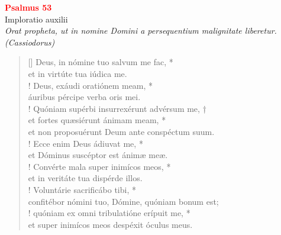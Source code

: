 


\def\greinitialformat#1{%
{\fontsize{39}{39}\selectfont #1}%
}




\vspace{0.3cm}
\begin{center}
 \textcolor{red}{\large \bf Psalmus 53}\\
Imploratio auxilii\\
\textit{\small Orat propheta, ut in nomine Domini a persequentium malignitate liberetur. (Cassiodorus)}
\end{center}
\begin{verse}[\versewidth]
Deus, in nómine tuo salvum me fac, *\\
et in virtúte tua iúdica me.\\!
\vin Deus, exáudi oratiónem meam, *\\
\vin áuribus pércipe verba oris mei.\\!
Quóniam supérbi insurrexérunt advérsum me, †\\
et fortes quæsiérunt ánimam meam, *\\
et non proposuérunt Deum ante conspéctum suum.\\!
\vin Ecce enim Deus ádiuvat me, *\\
\vin et Dóminus suscéptor est ánimæ meæ.\\!
Convérte mala super inimícos meos, *\\
et in veritáte tua dispérde illos.\\!
\vin Voluntárie sacrificábo tibi, *\\
\vin confitébor nómini tuo, Dómine, quóniam bonum est;\\!
quóniam ex omni tribulatióne erípuit me, *\\
et super inimícos meos despéxit óculus meus.\\
\end{verse}
\vspace{1cm}


